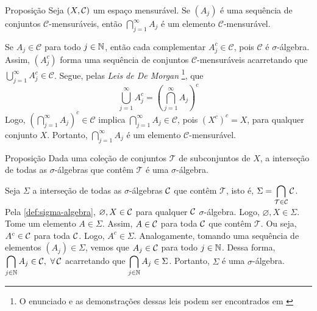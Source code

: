 \begin{env}{Proposição}
\label{prop:interseção-elementos-sigmas}
    Seja $(X, \operatorname{\mathcal{C}})$ um espaço mensurável.
    Se $(A_j)$ é uma sequência  de conjuntos $\mathcal{C} $-mensuráveis, então $\displaystyle \bigcap_{j = 1}^\infty A_j$ é um elemento $\mathcal{C}$-mensurável.
\end{env}
\begin{prova}
    Se $A_j \in \mathcal{C}$ para todo $j \in \operatorname{\mathbb{N}}$, então cada complementar $A_j^c \in \mathcal{C}$, pois $\mathcal{C}$ é $\sigma$-álgebra. 
    Assim, $(A_j^c)$ forma uma sequência de conjuntos $\mathcal{C}$-mensuráveis acarretando que 
    $\displaystyle \bigcup_{j = 1}^\infty A_j^c \in \mathcal{C}$. 
    Segue, pelas \textit{Leis de De Morgan}
    \footnote{O enunciado e as demonstrações dessas leis podem ser encontrados em \cite[p.26]{elon}}, que 
    $$
    \displaystyle \bigcup_{j = 1}^\infty A_j^c 
    = \left(\displaystyle \bigcap_{j = 1}^\infty A_j\right)^c
  	$$
	Logo, $\left(\displaystyle \bigcap_{j = 1}^\infty A_j\right)^c \in \mathcal{C}$ implica $\displaystyle \bigcap_{j = 1}^\infty A_j \in \mathcal{C}$, pois $(X^c)^c = X$, para qualquer conjunto $X$.
	Portanto, $\displaystyle \bigcap_{j = 1}^\infty A_j$ é um elemento $\mathcal{C}$-mensurável.
\end{prova}

\begin{env}{Proposição}
	\label{prop: provar que a menor sigma algebra e algebra}
	Dada uma coleção de conjuntos $\mathcal{T}$ de subconjuntos de $X$, a interseção de todas as $\sigma$-álgebras que contêm $\mathcal{T}$ é uma $\sigma$-álgebra.
\end{env}
\begin{prova}
	Seja $\Sigma$ a interseção de todas as $\sigma$-álgebras $\operatorname{\mathcal{C}}$ que contêm $\mathcal{T}$, isto é, 
	$\Sigma = \displaystyle \bigcap_{\mathcal{T} \in \operatorname{\mathcal{C}} } \operatorname{\mathcal{C}}$.
	Pela \ref{def:sigma-algebra}, $\varnothing, X \in \operatorname{\mathcal{C}}$ para qualquer $\operatorname{\mathcal{C}}$ $\sigma$-álgebra.
	Logo, $\varnothing, X \in \Sigma$.
	Tome um elemento $A \in \Sigma$.
	Assim, $A \in \operatorname{\mathcal{C}}$ para toda $\operatorname{\mathcal{C}}$ que contêm $\mathcal{T}$.
	Ou seja, $A^c \in \operatorname{\mathcal{C}}$ para toda \sigal $\operatorname{\mathcal{C}}$. 
	Logo, $A^c \in \Sigma$.
	Analogamente, tomando uma sequência de elementos $(A_j) \in \Sigma$, vemos que $A_j \in \operatorname{\mathcal{C}}$ para todo $j \in \operatorname{\mathbb{N}}$. 
	Dessa forma, $\displaystyle \bigcap_{j \in \N} A_j \in \cc,\ \forall \cc$ acarretando que $\displaystyle \bigcap_{j \in \operatorname{\mathbb{N}}} A_j \in \Sigma$.
	Portanto, $\Sigma$ é uma $\sigma$-álgebra.
\end{prova}

